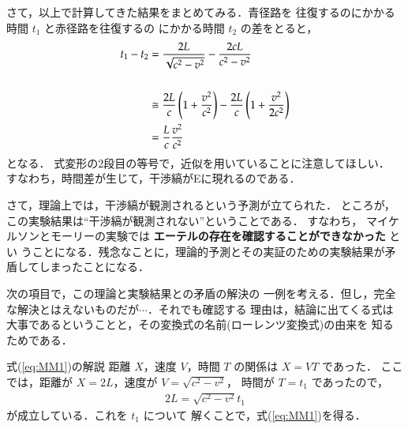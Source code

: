             さて，以上で計算してきた結果をまとめてみる．青径路を
            往復するのにかかる時間 $t_{1}$ と赤径路を往復するの
            にかかる時間 $t_{2}$ の差をとると，
                \begin{align}\label{eq:MM_10}
                   t_{1}-t_{2}&=\frac{2L}{\sqrt{c^{2}-v^{2}}}-\frac{2cL}{c^{2}-v^{2}}\notag \\ \notag \\
                   &\cong\frac{2L}{c}\left( 1+\frac{v^{2}}{c^{2}}\right)
                   -\frac{2L}{c}\left( 1+\frac{v^{2}}{2c^{2}}\right) \notag \\
                   &=\frac{L}{c}\frac{v^{2}}{c^{2}}
                \end{align}
            となる．
            式変形の2段目の等号で，近似を用いていることに注意してほしい．
            すなわち，時間差が生じて，干渉縞がEに現れるのである．

            さて，理論上では，干渉縞が観測されるという予測が立てられた．
            ところが，この実験結果は“干渉縞が観測されない”ということである．
            すなわち，
                マイケルソンとモーリーの実験では \textbf{エーテルの存在を確認することができなかった} とい
            うことになる．残念なことに，理論的予測とその実証のための実験結果が矛盾してしまったことになる．

            次の項目で，この理論と実験結果との矛盾の解決の
            一例を考える．但し，完全な解決とはえないものだが$\cdots$．それでも確認する
            理由は，結論に出てくる式は大事であるということと，その変換式の名前(ローレンツ変換式)の由来を
            知るためである．


                \begin{memo}{式(\ref{eq:MM1})の解説}
                    距離 $X$，速度 $V$，時間 $T$ の関係は $X=VT$ であった．
                    ここでは，距離が $X=2L$，速度が $V=\sqrt{c^{2}-v^{2}}$，
                    時間が $T=t_{1}$ であったので，
                        \begin{align*}
                            2L=\sqrt{c^{2}-v^{2}}t_{1}
                        \end{align*}
                    が成立している．これを $t_{1}$ について
                    解くことで，式(\ref{eq:MM1})を得る．
                \end{memo}

